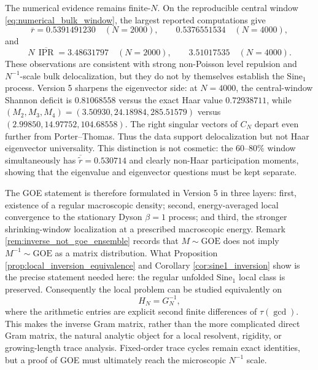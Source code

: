 \documentclass[11pt]{amsart}
\numberwithin{equation}{section}
\theoremstyle{plain}
\theoremstyle{definition}
\theoremstyle{remark}
\newcommand{\IPR}{\operatorname{IPR}}
\begin{document}
The numerical evidence remains finite-$N$.  On the reproducible central window \eqref{eq:numerical_bulk_window}, the largest reported computations give
\begin{equation}
\overline r
=0.5391491230\quad(N=2000),
\qquad
0.5376551534\quad(N=4000),
\end{equation}
and
\begin{equation}
N\,\overline{\IPR}
=3.48631797\quad(N=2000),
\qquad
3.51017535\quad(N=4000).
\end{equation}
These observations are consistent with strong non-Poisson level repulsion and $N^{-1}$-scale bulk delocalization, but they do not by themselves establish the $\mathrm{Sine}_1$ process.  Version 5 sharpens the eigenvector side: at $N=4000$, the central-window Shannon deficit is $0.81068558$ versus the exact Haar value $0.72938711$, while $(M_2,M_3,M_4)=(3.50930,24.18984,285.51579)$ versus $(2.99850,14.97752,104.68558)$.  The right singular vectors of $C_N$ depart even further from Porter--Thomas.  Thus the data support delocalization but not Haar eigenvector universality.  This distinction is not cosmetic: the $60$--$80\%$ window simultaneously has $\overline{\widetilde r}=0.530714$ and clearly non-Haar participation moments, showing that the eigenvalue and eigenvector questions must be kept separate.

The GOE statement is therefore formulated in Version 5 in three layers: first, existence of a regular macroscopic density; second, energy-averaged local convergence to the stationary Dyson $\beta=1$ process; and third, the stronger shrinking-window localization at a prescribed macroscopic energy.  Remark \ref{rem:inverse_not_goe_ensemble} records that $M\sim\mathrm{GOE}$ does not imply $M^{-1}\sim\mathrm{GOE}$ as a matrix distribution.  What Proposition \ref{prop:local_inversion_equivalence} and Corollary \ref{cor:sine1_inversion} show is the precise statement needed here: the regular unfolded $\mathrm{Sine}_1$ local class is preserved.  Consequently the local problem can be studied equivalently on
\begin{equation}
H_N=G_N^{-1},
\end{equation}
where the arithmetic entries are explicit second finite differences of $\tau(\gcd)$.  This makes the inverse Gram matrix, rather than the more complicated direct Gram matrix, the natural analytic object for a local resolvent, rigidity, or growing-length trace analysis.  Fixed-order trace cycles remain exact identities, but a proof of GOE must ultimately reach the microscopic $N^{-1}$ scale.
\end{document}
